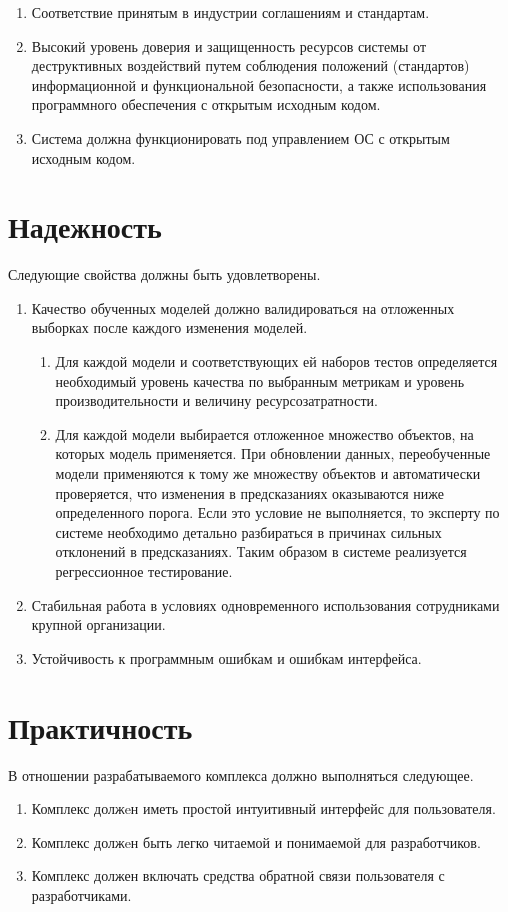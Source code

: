 \begin{enumerate}
    \item Соответствие принятым в индустрии соглашениям и стандартам.
    \item Высокий уровень доверия и защищенность ресурсов системы от деструктивных воздействий путем соблюдения положений (стандартов) информационной и функциональной безопасности, а также использования программного обеспечения с открытым исходным кодом.
    \item Система должна функционировать под управлением ОС с открытым исходным кодом.
\end{enumerate}

\section{Надежность}
Следующие свойства должны быть удовлетворены.
\begin{enumerate}
    \item  Качество обученных моделей должно валидироваться на отложенных выборках после каждого изменения моделей.
        \begin{enumerate}
            \item Для каждой модели и соответствующих ей наборов тестов определяется необходимый уровень качества по выбранным метрикам и уровень производительности и величину ресурсозатратности.
            \item Для каждой модели выбирается отложенное множество объектов, на которых модель применяется. При обновлении данных, переобученные модели применяются к тому же множеству объектов и автоматически проверяется, что изменения в предсказаниях оказываются ниже определенного порога. Если это условие не выполняется, то эксперту по системе необходимо детально разбираться в причинах сильных отклонений в предсказаниях. Таким образом в системе реализуется регрессионное тестирование.
        \end{enumerate}
    \item  Стабильная работа в условиях одновременного использования сотрудниками крупной организации.
    \item  Устойчивость к программным ошибкам и ошибкам интерфейса.
\end{enumerate}
\section{Практичность}
В отношении разрабатываемого комплекса должно выполняться следующее.
\begin{enumerate}
    \item Комплекс должeн иметь простой интуитивный интерфейс для пользователя.
    \item Комплекс должeн быть легко читаемой и понимаемой для разработчиков.
    \item Комплекс должен включать средства обратной связи пользователя с разработчиками.
\end{enumerate}
